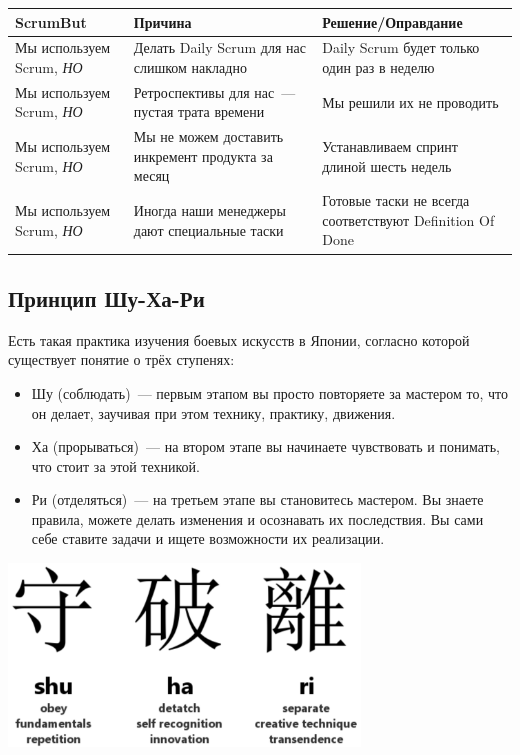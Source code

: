 \documentclass{../../text-style}
\begin{document}
\begin{center}
    \begin{tabularx}{\textwidth} { 
        | >{\centering\arraybackslash}X 
        | >{\centering\arraybackslash}X 
        | >{\centering\arraybackslash}X | }
        \hline
        ScrumBut                       & Причина                                           & Решение/Оправдание \\
        \hline
        Мы используем Scrum, \emph{НО} & Делать Daily Scrum для нас слишком накладно       & Daily Scrum будет только один раз в неделю               \\
        \hline
        Мы используем Scrum, \emph{НО} & Ретроспективы для нас~--- пустая трата времени    & Мы решили их не проводить                                \\
        \hline
        Мы используем Scrum, \emph{НО} & Мы не можем доставить инкремент продукта за месяц & Устанавливаем спринт длиной шесть недель                 \\
        \hline
        Мы используем Scrum, \emph{НО} & Иногда наши менеджеры дают специальные таски      & Готовые таски не всегда соответствуют Definition Of Done \\
        \hline
    \end{tabularx}
\end{center}

\subsection{Принцип Шу-Ха-Ри}

Есть такая практика изучения боевых искусств в Японии, согласно которой существует понятие о трёх ступенях:

\begin{itemize}
    \item Шу (соблюдать)~--- первым этапом вы просто повторяете за мастером то, что он делает, заучивая при этом технику, практику, движения.
    \item Ха (прорываться)~--- на втором этапе вы начинаете чувствовать и понимать, что стоит за этой техникой.
    \item Ри (отделяться)~--- на третьем этапе вы становитесь мастером. Вы знаете правила, можете делать изменения и осознавать их последствия. Вы сами себе ставите задачи и ищете возможности их реализации.
\end{itemize}

\begin{center}
    \includegraphics[width=0.7\textwidth]{shuHaRi.png}
\end{center}
\end{document}

